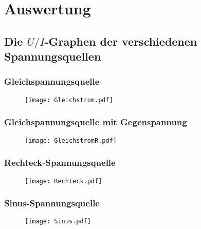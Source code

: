 \section{Auswertung}
\label{sec:Auswertung}



\subsection{Die $U/I$-Graphen der verschiedenen Spannungsquellen}

\subsubsection{Gleichspannungsquelle}
\begin{figure}[H]
	\centering
	\caption{}
	\texttt{[image: Gleichstrom.pdf]}
	\label{fig:Gleichstrom}
\end{figure}


\newpage
\subsubsection{Gleichspannungsquelle mit Gegenspannung}

\begin{figure}[H]
	\centering
	\caption{}
	\texttt{[image: GleichstromR.pdf]}
	\label{fig:GleichstromR}
\end{figure}


\newpage
\subsubsection{Rechteck-Spannungsquelle}

\begin{figure}[H]
	\centering
	\caption{}
	\texttt{[image: Rechteck.pdf]}
	\label{fig:Rechteck}
\end{figure}


\newpage
\subsubsection{Sinus-Spannungsquelle}

\begin{figure}[H]
  \centering
  \caption{}
  \texttt{[image: Sinus.pdf]}
  \label{fig:Sinus}
\end{figure}


